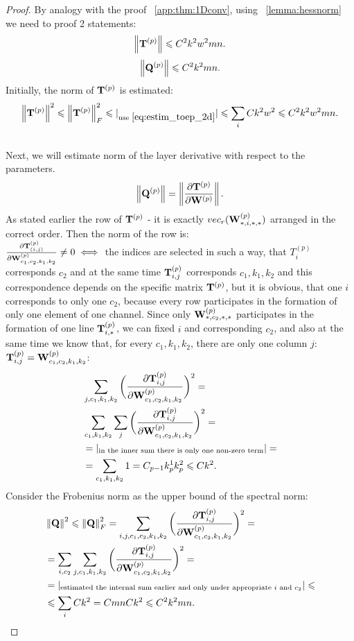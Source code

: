 \documentclass[conference]{IEEEtran}
\begin{document}
\begin{proof}
By analogy with the proof ~\ref{app:thm:1Dconv}, using ~\ref{lemma:hessnorm} we need to proof 2 statements: \\
\[\left\|\mathbf{T}^{(p)}\right\| \leqslant C^2k^2w^2mn.\]
\[\left\|\mathbf{Q}^{(p)}\right\| \leqslant C^2k^2mn.\]
Initially, the norm of $\mathbf{T}^{(p)}$ is estimated:
\[\left\|\mathbf{T}^{(p)}\right\|^2 \leqslant \left\|\mathbf{T}^{(p)}\right\|_F^2 \leqslant |_{\text{use } \eqref{eq:estim_toep_2d}}| \leqslant \sum\limits_{i} Ck^2w^2 \leqslant C^2k^2w^2mn.\] \\
Next, we will estimate norm of the layer derivative with respect to the parameters.
\[\left\|\mathbf{Q}^{(p)}\right\| = \left\|\frac{\partial \mathbf{T}^{(p)}}{\partial \mathbf{W}^{(p)}}\right\|.\]
As stated earlier the row of $\mathbf{T}^{(p)}$ - it is exactly $vec_r(\mathbf{W}^{(p)}_{*, i, *, *})$ arranged in the correct order.
Then the norm of the row is: \\
$\frac{\partial \mathbf{T}^{(p)}_{(i, j)}}{\partial \mathbf{W}^{(p)}_{c_1, c_2, k_1, k_2}} \neq 0 \iff$ the indices are selected in such a way, that $T^{(p)}_i$ corresponds $c_2$ and at the same time $\mathbf{T}^{(p)}_{i, j}$ corresponds $c_1, k_1, k_2$ and this correspondence depends on the specific matrix $\mathbf{T}^{(p)}$, but it is obvious, that one $i$ corresponds to only one $c_2$, because every row participates in the formation of only one element of one channel. Since only $\mathbf{W}^{(p)}_{*, c_2, *, *}$ participates in the formation of one line $\mathbf{T}^{(p)}_{i, *}$, we can fixed $i$ and corresponding $c_2$, and also at the same time we know that, for every $c_1, k_1, k_2$, there are only one column $j$: $\mathbf{T}^{(p)}_{i, j} = \mathbf{W}^{(p)}_{c_1, c_2, k_1, k_2}$:
\begin{align*}
& \sum\limits_{j,c_1, k_1, k_2}\bigg(\frac{\partial \mathbf{T}^{(p)}_{i, j}}{\partial\mathbf{W}^{(p)}_{c_1, c_2, k_1, k_2}}\bigg)^2 = \\
& \sum\limits_{c_1, k_1, k_2}\sum\limits_{j}\bigg(\frac{\partial \mathbf{T}^{(p)}_{i, j}}{\partial\mathbf{W}^{(p)}_{c_1, c_2, k_1, k_2}}\bigg)^2 = \\
& = |_{\text{in the inner sum there is only one non-zero term}}| = \\
& = \sum\limits_{c_1, k_1, k_2}1 = C_{p-1}k_p^1k_p^2 \leqslant Ck^2.
\end{align*}
Consider the Frobenius norm as the upper bound of the spectral norm:
\begin{align*}
& \left\|\mathbf{Q}\right\|^2 \leqslant \left\|\mathbf{Q}\right\|^2_F = \sum\limits_{i, j, c_1, c_2, k_1, k_2}\bigg(\frac{\partial \mathbf{T}^{(p)}_{i,j}}{\partial \mathbf{W}^{(p)}_{c_1, c_2, k_1, k_2}}\bigg)^2 = \\
& = \sum\limits_{i, c_2}\sum\limits_{j, c_1, k_1, k_2}\bigg(\frac{\partial \mathbf{T}^{(p)}_{i,j}}{\partial \mathbf{W}^{(p)}_{c_1, c_2, k_1, k_2}}\bigg)^2 = \\
& = |_{\text{estimated the internal sum earlier and only under appropriate $i$ and $c_2$}}| \leqslant \\
& \leqslant \sum\limits_{i}Ck^2 = CmnCk^2 \leqslant C^2k^2mn.
\end{align*}
\end{proof}
\end{document}

